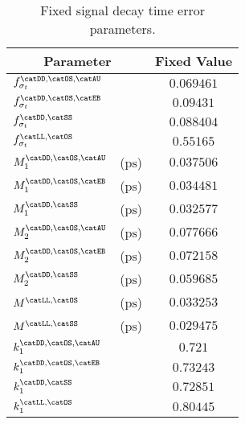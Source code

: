 \begin{table}[htb]
\caption{Fixed signal decay time error parameters.}
\label{tab:app:measurement_of_sin2beta:cpv_measurement:fixed_parameters:decay_time_error:sig}
\centering
\begin{tabular}{llr@{$\,\pm\,$}l}
  \toprule
  \multicolumn{2}{c}{Parameter}              & \multicolumn{2}{c}{Fixed Value} \\
  \midrule
  $f_{\sigma_t}^\text{\catDD,\catOS,\catAU}$ &                       & \multicolumn{2}{c}{$0.069461$}\\
  $f_{\sigma_t}^\text{\catDD,\catOS,\catEB}$ &                       & \multicolumn{2}{c}{$0.09431$}\\
  $f_{\sigma_t}^\text{\catDD,\catSS}$        &                       & \multicolumn{2}{c}{$0.088404$}\\
  $f_{\sigma_t}^\text{\catLL,\catOS}$        &                       & \multicolumn{2}{c}{$0.55165$}\\
  $M_1^\text{\catDD,\catOS,\catAU}$          & ($\si{\pico\second}$) & \multicolumn{2}{c}{$0.037506$}\\
  $M_1^\text{\catDD,\catOS,\catEB}$          & ($\si{\pico\second}$) & \multicolumn{2}{c}{$0.034481$}\\
  $M_1^\text{\catDD,\catSS}$                 & ($\si{\pico\second}$) & \multicolumn{2}{c}{$0.032577$}\\
  $M_2^\text{\catDD,\catOS,\catAU}$          & ($\si{\pico\second}$) & \multicolumn{2}{c}{$0.077666$}\\
  $M_2^\text{\catDD,\catOS,\catEB}$          & ($\si{\pico\second}$) & \multicolumn{2}{c}{$0.072158$}\\
  $M_2^\text{\catDD,\catSS}$                 & ($\si{\pico\second}$) & \multicolumn{2}{c}{$0.059685$}\\
  $M^\text{\catLL,\catOS}$                   & ($\si{\pico\second}$) & \multicolumn{2}{c}{$0.033253$}\\
  $M^\text{\catLL,\catSS}$                   & ($\si{\pico\second}$) & \multicolumn{2}{c}{$0.029475$}\\
  $k_1^\text{\catDD,\catOS,\catAU}$          &                       & \multicolumn{2}{c}{$0.721$}\\
  $k_1^\text{\catDD,\catOS,\catEB}$          &                       & \multicolumn{2}{c}{$0.73243$}\\
  $k_1^\text{\catDD,\catSS}$                 &                       & \multicolumn{2}{c}{$0.72851$}\\
  $k_1^\text{\catLL,\catOS}$                 &                       & \multicolumn{2}{c}{$0.80445$}\\

\end{tabular}
\end{table}
